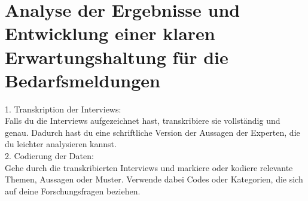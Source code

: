 
\section{Analyse der Ergebnisse und Entwicklung einer klaren Erwartungshaltung für die Bedarfsmeldungen}

1. Transkription der Interviews:\\
Falls du die Interviews aufgezeichnet hast, transkribiere sie vollständig und genau. Dadurch hast du eine schriftliche Version der Aussagen der Experten, die du leichter analysieren kannst.\\

2. Codierung der Daten:\\
Gehe durch die transkribierten Interviews und markiere oder kodiere relevante Themen, Aussagen oder Muster. Verwende dabei Codes oder Kategorien, die sich auf deine Forschungsfragen beziehen.\\


